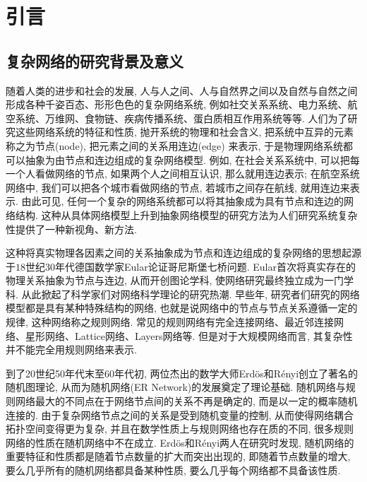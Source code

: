 \chapter{引言}\label{chap:introduction}


\section{复杂网络的研究背景及意义}

随着人类的进步和社会的发展, 人与人之间、人与自然界之间以及自然与自然之间形成各种千姿百态、形形色色的复杂网络系统, 例如社交关系系统、电力系统、航空系统、万维网、食物链、疾病传播系统、蛋白质相互作用系统等等. 人们为了研究这些网络系统的特征和性质, 抛开系统的物理和社会含义, 把系统中互异的元素称之为节点(node), 把元素之间的关系用连边(edge) 来表示, 于是物理网络系统都可以抽象为由节点和连边组成的复杂网络模型. 例如, 在社会关系系统中, 可以把每一个人看做网络的节点, 如果两个人之间相互认识, 那么就用连边表示; 在航空系统网络中, 我们可以把各个城市看做网络的节点, 若城市之间存在航线, 就用连边来表示. 由此可见, 任何一个复杂的网络系统都可以将其抽象成为具有节点和连边的网络结构. 这种从具体网络模型上升到抽象网络模型的研究方法为人们研究系统复杂性提供了一种新视角、新方法.

这种将真实物理各因素之间的关系抽象成为节点和连边组成的复杂网络的思想起源于$18$世纪$30$年代德国数学家Eular论证哥尼斯堡七桥问题. Eular首次将真实存在的物理关系抽象为节点与连边, 从而开创图论学科, 使网络研究最终独立成为一门学科. 从此掀起了科学家们对网络科学理论的研究热潮. 早些年, 研究者们研究的网络模型都是具有某种特殊结构的网络, 也就是说网络中的节点与节点关系遵循一定的规律, 这种网络称之规则网络. 常见的规则网络有完全连接网络、最近邻连接网络、星形网络、Lattice网络、Layers网络等. 但是对于大规模网络而言, 其复杂性并不能完全用规则网络来表示.

到了20世纪50年代末至60年代初, 两位杰出的数学大师Erdös和Rényi创立了著名的随机图理论, 从而为随机网络(ER Network)的发展奠定了理论基础. 随机网络与规则网络最大的不同点在于网络节点间的关系不再是确定的, 而是以一定的概率随机连接的. 由于复杂网络节点之间的关系是受到随机变量的控制, 从而使得网络耦合拓扑空间变得更为复杂, 并且在数学性质上与规则网络也存在质的不同, 很多规则网络的性质在随机网络中不在成立. Erdös和Rényi两人在研究时发现, 随机网络的重要特征和性质都是随着节点数量的扩大而突出出现的, 即随着节点数量的增大, 要么几乎所有的随机网络都具备某种性质, 要么几乎每个网络都不具备该性质.

\begin{comment}[htb]
\begin{minipage}[t]{0.48\linewidth}
\centering
\texttt{[image: introduction/wattsstrogatz.eps]}
\caption{小世界网络.}\label{smallworld}
\end{minipage}~~
\begin{minipage}[t]{0.48\linewidth}
\centering
\texttt{[image: introduction/scale.png]}
\caption{无标度网络.}\label{scalefree}
\end{minipage}
\end{comment}

